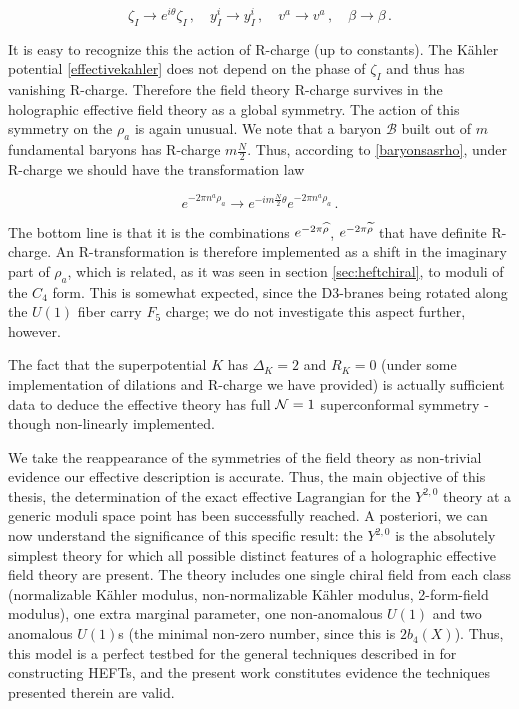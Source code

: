 \begin{equation}
	\zeta_I \rightarrow e^{i\theta} \zeta_I\,, \quad y^i_I \rightarrow y^i_I\,, \quad v^a \rightarrow v^a\,,\quad \beta \rightarrow \beta\,.
	\label{}
\end{equation}

It is easy to recognize this the action of R-charge (up to constants). The K\"ahler potential \eqref{effectivekahler} does not depend on the phase of $\zeta_I$ and thus has vanishing R-charge. Therefore the field theory R-charge survives in the holographic effective field theory as a global symmetry. The action of this symmetry on the $\rho_a$ is again unusual. We note that a baryon $\mathcal{B}$ built out of $m$ fundamental baryons has R-charge $m\frac{N}{2}$. Thus, according to \eqref{baryonsasrho}, under R-charge we should have the transformation law

\begin{equation}
	e^{-2\pi n^a \rho_a} \rightarrow e^{-im \frac{N}{2}\theta} e^{-2\pi n^a \rho_a}\,.
	\label{}
\end{equation}

The bottom line is that it is the combinations $e^{-2\pi \widehat{\rho}}$, $e^{-2\pi\widetilde{\rho}}$ that have definite R-charge. An R-transformation is therefore implemented as a shift in the imaginary part of $\rho_a$, which is related, as it was seen in section \ref{sec:heftchiral}, to moduli of the $C_4$ form. This is somewhat expected, since the D3-branes being rotated along the $U(1)$ fiber carry $F_5$ charge; we do not investigate this aspect further, however.

The fact that the superpotential $K$ has $\Delta_K = 2$ and $R_K = 0$ (under some implementation of dilations and R-charge we have provided) is actually sufficient data \cite{proofscft} to deduce the effective theory has full $\mathcal{N} = 1$ superconformal symmetry - though non-linearly implemented.


We take the reappearance of the symmetries of the field theory as non-trivial evidence our effective description is accurate. Thus, the main objective of this thesis, the determination of the exact effective Lagrangian for the $Y^{2,0}$ theory at a generic moduli space point has been successfully reached. A posteriori, we can now understand the significance of this specific result: the $Y^{2,0}$ is the absolutely simplest theory for which all possible distinct features of a holographic effective field theory are present. The theory includes one single chiral field from each class (normalizable K\"ahler modulus, non-normalizable K\"ahler modulus, 2-form-field modulus), one extra marginal parameter, one non-anomalous $U(1)$ and two anomalous $U(1)$s (the minimal non-zero number, since this is $2b_4(X)$). Thus, this model is a perfect testbed for the general techniques described in \cite{MZ} for constructing HEFTs, and the present work constitutes evidence the techniques presented therein are valid.

